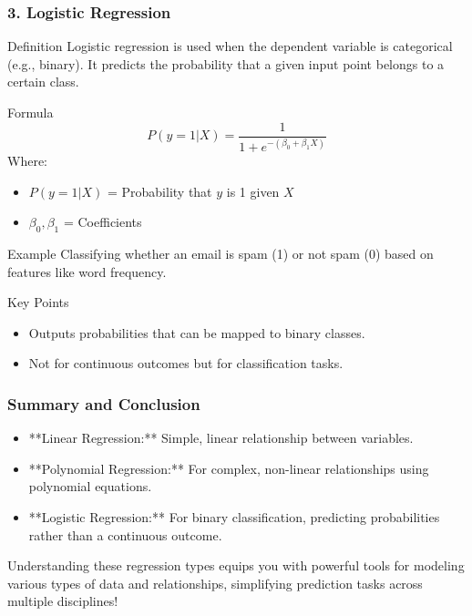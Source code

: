 \documentclass[aspectratio=169]{beamer}
\begin{document}
\begin{frame}[fragile]
    \frametitle{3. Logistic Regression}
    \begin{block}{Definition}
        Logistic regression is used when the dependent variable is categorical (e.g., binary). It predicts the probability that a given input point belongs to a certain class.
    \end{block}
    
    \begin{block}{Formula}
        \begin{equation}
            P(y=1|X) = \frac{1}{1 + e^{-(\beta_0 + \beta_1X)}}
        \end{equation}
        Where:
        \begin{itemize}
            \item \( P(y=1|X) \) = Probability that \( y \) is 1 given \( X \)
            \item \( \beta_0, \beta_1 \) = Coefficients 
        \end{itemize}
    \end{block}

    \begin{block}{Example}
        Classifying whether an email is spam (1) or not spam (0) based on features like word frequency.
    \end{block}

    \begin{block}{Key Points}
        \begin{itemize}
            \item Outputs probabilities that can be mapped to binary classes.
            \item Not for continuous outcomes but for classification tasks.
        \end{itemize}
    \end{block}
\end{frame}

\begin{frame}[fragile]
    \frametitle{Summary and Conclusion}
    \begin{itemize}
        \item **Linear Regression:** Simple, linear relationship between variables.
        \item **Polynomial Regression:** For complex, non-linear relationships using polynomial equations.
        \item **Logistic Regression:** For binary classification, predicting probabilities rather than a continuous outcome.
    \end{itemize}
    
    Understanding these regression types equips you with powerful tools for modeling various types of data and relationships, simplifying prediction tasks across multiple disciplines!
\end{frame}
\end{document}
